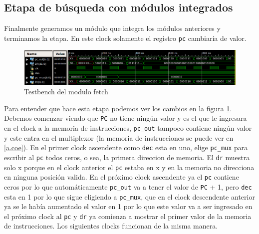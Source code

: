 \subsection{Etapa de búsqueda con m\'odulos integrados}
Finalmente generamos un m\'odulo que integra los m\'odulos anteriores y terminamos la etapa. En este clock solamente el registro \texttt{pc} cambiaría de valor. 

\begin{figure}[H]
\centering
\includegraphics[scale=0.45]{Capitulo01/fetch_test}
\caption{Testbench del modulo fetch}
\label{fig:fetcht}
\end{figure}

Para entender que hace esta etapa podemos ver los cambios en la figura \ref{fig:fetcht}. Debemos comenzar viendo que \texttt{PC} no tiene ning\'un valor y es el que le ingresara en el clock a la memoria de instrucciones, \texttt{pc\_out} tampoco contiene ning\'un valor y este entra en el multiplexor (la memoria de instrucciones se puede ver en \ref{a.coe}).  
En el primer clock ascendente como \texttt{dec} esta en uno, elige \texttt{pc\_mux} para escribir al \texttt{pc} todos ceros, o sea, la primera direccion de memoria. El \texttt{dr}  muestra solo x porque en el clock anterior el \texttt{pc} estaba en x y en la memoria no direcciona en ninguna posici\'on valida. En el pr\'oximo clock ascendente ya el \texttt{pc} contiene ceros por lo que autom\'aticamente \texttt{pc\_out} va a tener el valor de \texttt{PC} + 1, pero \texttt{dec} esta en 1 por lo que sigue eligiendo a \texttt{pc\_mux}, que en el clock descendente anterior ya se le hab\'ia aumentado el valor en 1 por lo que este valor va a ser ingresado en el pr\'oximo clock al \texttt{pc} y \texttt{dr} ya comienza a mostrar el primer valor de la memoria de instrucciones. Los siguientes clocks funcionan de la misma manera.

